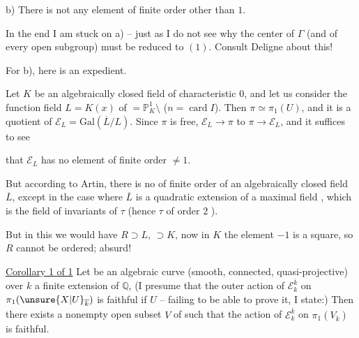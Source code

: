 b) There is not  any element of finite order other than $1$.

In the end I am stuck on a) -- just as I do not see why the center of $\Gamma$
(and of every open subgroup) must be reduced to $(1)$. Consult Deligne about this!

For b), here is an expedient.

Let $K$ be an algebraically closed field of characteristic $0$, and let us consider the function field
$L=K(x)$ of 
$=\mathbb P^1_K\setminus$
($n=\operatorname{card} I$). Then $\pi\simeq\pi_1(U)$, and it is a quotient of
$\mathcal E_L=\mathrm{Gal}(\overline L/L)$.
Since $\pi$ is free, $\mathcal E_L\longrightarrow\pi$  to
$\pi\longrightarrow\mathcal E_L$, and it suffices to see



that $\mathcal E_L$ has no element of finite order $\ne 1$.

But according to Artin, there is no  \inserted{\unsure{$\tau$}}
of finite order  of an algebraically closed field $\overline L$,
except in the case where $\overline L$ is a quadratic extension of a
 maximal  field
,  which is the field of invariants of
$\tau$ (hence $\tau$ of order $2$ ).

 But in this  we would have $R\supset L$,
$\supset K$, now in $K$ the element $-1$ is a square,
so $R$ cannot be ordered; absurd!

\uline{Corollary 1 of  1} Let  be an algebraic curve
(smooth,  connected, quasi-projective) over $k$ a finite extension of
$\mathbb Q$,  (I presume that the outer action of
$\mathcal E_k^{\overline k}$ on $\pi_1(\unsure{X|U}_{\overline k})$ is faithful
if $U$  -- failing to be able to prove it, I state:)
Then there exists a nonempty open subset $V$ of  such that
the  action of $\mathcal E_k^{\overline k}$ on
$\pi_1(V_{\overline k})$ is faithful.

